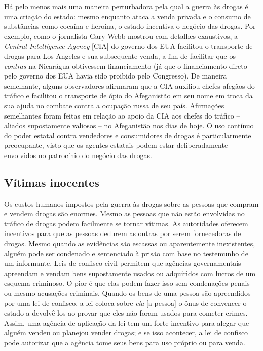 Há pelo menos mais uma maneira perturbadora pela qual a guerra às drogas é uma criação do estado: mesmo enquanto ataca a venda privada e o consumo de substâncias como cocaína e heroína, o estado incentiva o negócio das drogas. Por exemplo, como o jornalista Gary Webb mostrou com detalhes exaustivos, a \emph{Central Intelligence Agency} [CIA] do governo dos EUA facilitou o transporte de drogas para Los Angeles e sua subsequente venda, a fim de facilitar que os \emph{contras} na Nicarágua obtivessem financiamento (já que o financiamento direto pelo governo dos EUA havia sido proibido pelo Congresso). De maneira semelhante, alguns observadores afirmaram que a CIA auxiliou chefes afegãos do tráfico e facilitou o transporte de ópio do Afeganistão em seu nome em troca da sua ajuda no combate contra a ocupação russa de seu país. Afirmações semelhantes foram feitas em relação ao apoio da CIA aos chefes do tráfico -- aliados supostamente valiosos -- no Afeganistão nos dias de hoje. O uso contínuo do poder estatal contra vendedores e consumidores de drogas é particularmente preocupante, visto que os agentes estatais podem estar deliberadamente envolvidos no patrocínio do negócio das drogas.

\subsection*{Vítimas inocentes}

Os custos humanos impostos pela guerra às drogas sobre as pessoas que compram e vendem drogas são enormes. Mesmo as pessoas que não estão envolvidas no tráfico de drogas podem facilmente se tornar vítimas. As autoridades oferecem incentivos para que as pessoas dedurem as outras por serem fornecedoras de drogas. Mesmo quando as evidências são escassas ou aparentemente inexistentes, alguém pode ser condenado e sentenciado à prisão com base no testemunho de um informante. Leis de confisco civil permitem que agências governamentais apreendam e vendam bens supostamente usados ou adquiridos com lucros de um esquema criminoso. O pior é que elas podem fazer isso sem condenações penais -- ou mesmo acusações criminais. Quando os bens de uma pessoa são apreendidos por uma lei de confisco, a lei coloca sobre \emph{ela} [a pessoa] o ônus de convencer o estado a devolvê-los ao provar que eles não foram usados para cometer crimes. Assim, uma agência de aplicação da lei tem um forte incentivo para alegar que alguém vendeu ou planejou vender drogas; e se isso acontecer, a lei de confisco pode autorizar que a agência tome seus bens para uso próprio ou para venda.

